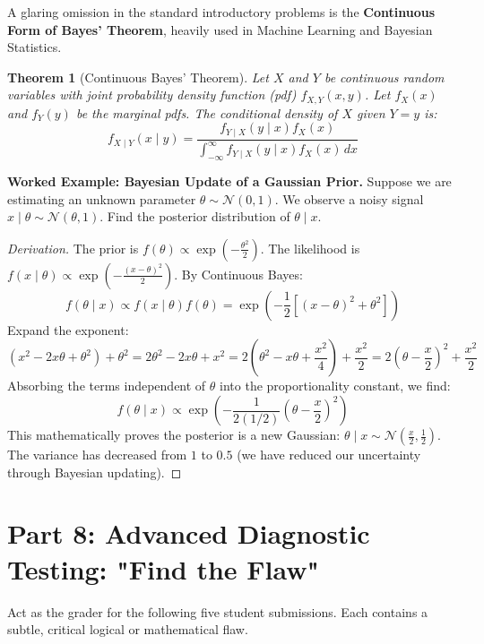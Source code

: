 \documentclass[12pt]{article}
\newtheorem{theorem}{Theorem}[section]
\theoremstyle{definition}
\theoremstyle{remark}
\begin{document}
A glaring omission in the standard introductory problems is the \textbf{Continuous Form of Bayes' Theorem}, heavily used in Machine Learning and Bayesian Statistics.

\begin{theorem}[Continuous Bayes' Theorem]
Let $X$ and $Y$ be continuous random variables with joint probability density function (pdf) $f_{X,Y}(x,y)$. Let $f_X(x)$ and $f_Y(y)$ be the marginal pdfs. The conditional density of $X$ given $Y=y$ is:
\[ f_{X \mid Y}(x \mid y) = \frac{f_{Y \mid X}(y \mid x)f_X(x)}{\int_{-\infty}^{\infty} f_{Y \mid X}(y \mid x)f_X(x) \, dx} \]
\end{theorem}

\textbf{Worked Example: Bayesian Update of a Gaussian Prior.}
Suppose we are estimating an unknown parameter $\theta \sim \mathcal{N}(0, 1)$. We observe a noisy signal $x \mid \theta \sim \mathcal{N}(\theta, 1)$. Find the posterior distribution of $\theta \mid x$.

\begin{proof}[Derivation]
The prior is $f(\theta) \propto \exp(-\frac{\theta^2}{2})$.
The likelihood is $f(x \mid \theta) \propto \exp(-\frac{(x - \theta)^2}{2})$.
By Continuous Bayes:
\[ f(\theta \mid x) \propto f(x \mid \theta) f(\theta) = \exp\left(-\frac{1}{2} [(x - \theta)^2 + \theta^2] \right) \]
Expand the exponent:
\[ (x^2 - 2x\theta + \theta^2) + \theta^2 = 2\theta^2 - 2x\theta + x^2 = 2\left(\theta^2 - x\theta + \frac{x^2}{4}\right) + \frac{x^2}{2} = 2\left(\theta - \frac{x}{2}\right)^2 + \frac{x^2}{2} \]
Absorbing the terms independent of $\theta$ into the proportionality constant, we find:
\[ f(\theta \mid x) \propto \exp\left(-\frac{1}{2(1/2)} \left(\theta - \frac{x}{2}\right)^2 \right) \]
This mathematically proves the posterior is a new Gaussian: $\theta \mid x \sim \mathcal{N}\left(\frac{x}{2}, \frac{1}{2}\right)$. The variance has decreased from $1$ to $0.5$ (we have reduced our uncertainty through Bayesian updating).
\end{proof}

\newpage
\section{Part 8: Advanced Diagnostic Testing: "Find the Flaw"}

Act as the grader for the following five student submissions. Each contains a subtle, critical logical or mathematical flaw.
\end{document}
